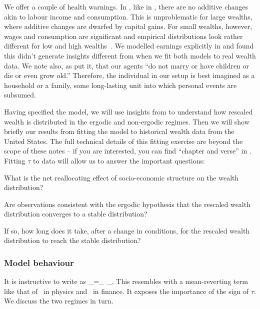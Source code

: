 We offer a couple of health warnings. In \RGBM, like in \GBM, there are no additive changes akin to labour income and consumption. This is unproblematic for large wealths, where additive changes are dwarfed by capital gains. For small wealths, however, wages and consumption are significant and empirical distributions look rather different for low and high wealths~\cite{DragulescuYakovenko2001}. We modelled earnings explicitly in \cite{BermanPetersAdamou2017} and found this didn't generate insights different from \RGBM when we fit both models to real wealth data. We note also, as \cite[p.~41]{meade1964efficiency} put it, that our agents ``do not marry or have children or die or even grow old.'' Therefore, the individual in our setup is best imagined as a household or a family, \ie some long-lasting unit into which personal events are subsumed.

Having specified the model, we will use insights from  to understand how rescaled wealth is distributed in the ergodic and non-ergodic regimes. Then we will show briefly our results from fitting the model to historical wealth data from the United States. The full technical details of this fitting exercise are beyond the scope of these notes -- if you are interested, you can find ``chapter and verse'' in \cite{BermanPetersAdamou2017}. Fitting $\tau$ to data will allow us to answer the important questions:
\bi
\item
What is the net reallocating effect of socio-economic structure on the wealth distribution?
\item
Are observations consistent with the ergodic hypothesis that the rescaled wealth distribution converges to a stable distribution?
\item
If so, how long does it take, after a change in conditions, for the rescaled wealth distribution to reach the stable distribution?
\ei


\subsubsection{Model behaviour}
It is instructive to write  as
\be
\gd\x_\gi=\underbrace{\x_\gi \left[\gmu \gd\t+\gsigma \gd\gW_\gi\left(\t\right)\right]}_{} \;\; \underbrace{ - \;\; \tau (\x_\gi-\ave{\x}_\N) \gd\t}_{}.
\ee
This resembles \GBM with a mean-reverting term like that of~\cite{UhlenbeckOrnstein1930} in physics and~\cite{Vasicek1977} in finance. It exposes the importance of the sign of $\tau$. We discuss the two regimes in turn.

